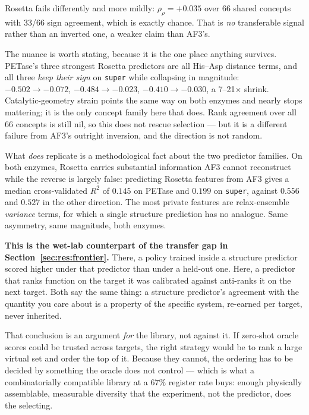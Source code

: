 Rosetta fails differently and more mildly: $\rho_{\rho} = +0.035$ over 66 shared
concepts with 33/66 sign agreement, which is exactly chance. That is \emph{no}
transferable signal rather than an inverted one, a weaker claim than AF3's.

The nuance is worth stating, because it is the one place anything survives.
PETase's three strongest Rosetta predictors are all His--Asp distance terms, and
all three \emph{keep their sign} on \texttt{super} while collapsing in
magnitude: $-0.502 \rightarrow -0.072$, $-0.484 \rightarrow -0.023$,
$-0.410 \rightarrow -0.030$, a 7--21$\times$ shrink. Catalytic-geometry strain
points the same way on both enzymes and nearly stops mattering; it is the only
concept family here that does. Rank agreement over all 66 concepts is still nil,
so this does not rescue selection --- but it is a different failure from AF3's
outright inversion, and the direction is not random.

What \emph{does} replicate is a methodological fact about the two predictor
families. On both enzymes, Rosetta carries substantial information AF3 cannot
reconstruct while the reverse is largely false: predicting Rosetta features from
AF3 gives a median cross-validated $R^2$ of $0.145$ on PETase and $0.199$ on
\texttt{super}, against $0.556$ and $0.527$ in the other direction. The most
private features are relax-ensemble \emph{variance} terms, for which a single
structure prediction has no analogue. Same asymmetry, same magnitude, both
enzymes.

\textbf{This is the wet-lab counterpart of the transfer gap in
Section~\ref{sec:res:frontier}.} There, a policy trained inside a structure
predictor scored higher under that predictor than under a held-out one. Here, a
predictor that ranks function on the target it was calibrated against
anti-ranks it on the next target. Both say the same thing: a structure
predictor's agreement with the quantity you care about is a property of the
specific system, re-earned per target, never inherited.

That conclusion is an argument \emph{for} the library, not against it. If
zero-shot oracle scores could be trusted across targets, the right strategy
would be to rank a large virtual set and order the top of it. Because they
cannot, the ordering has to be decided by something the oracle does not control
--- which is what a combinatorially compatible library at a $67\%$ register rate
buys: enough physically assemblable, measurable diversity that the experiment,
not the predictor, does the selecting.


